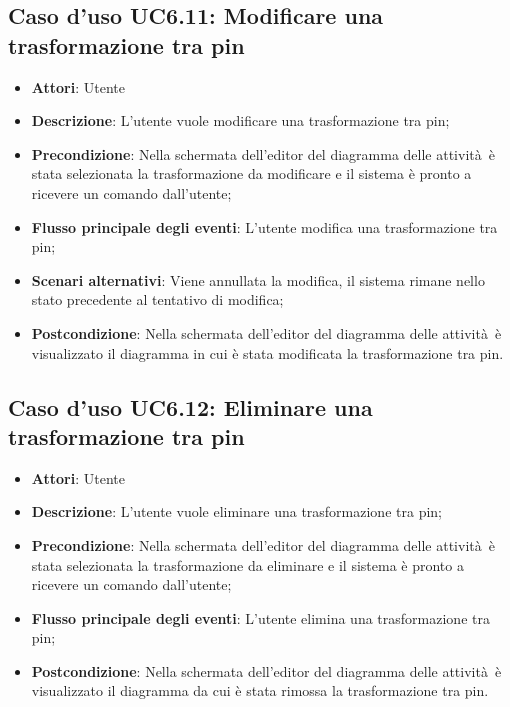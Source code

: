 \documentclass[../AnalisiDeiRequisiti.tex]{subfiles}
\begin{document}
				\subsection{Caso d'uso UC6.11: Modificare una trasformazione tra pin}
				\begin{itemize}
					\item \textbf{Attori}: Utente
					\item \textbf{Descrizione}: L'utente vuole modificare una trasformazione tra pin;
					\item \textbf{Precondizione}: Nella schermata dell'editor del diagramma delle attività è stata selezionata la trasformazione da modificare e il sistema è pronto a ricevere un comando dall'utente;
					\item \textbf{Flusso principale degli eventi}: L'utente modifica una trasformazione tra pin;
					\item \textbf{Scenari alternativi}: Viene annullata la modifica, il sistema rimane nello stato precedente al tentativo di modifica;
					\item \textbf{Postcondizione}: Nella schermata dell'editor del diagramma delle attività è visualizzato il diagramma in cui è stata modificata la trasformazione tra pin.
				\end{itemize}
				\subsection{Caso d'uso UC6.12: Eliminare una trasformazione tra pin}
				\begin{itemize}
					\item \textbf{Attori}: Utente
					\item \textbf{Descrizione}: L'utente vuole eliminare una trasformazione tra pin;
					\item \textbf{Precondizione}: Nella schermata dell'editor del diagramma delle attività è stata selezionata la trasformazione da eliminare e il sistema è pronto a ricevere un comando dall'utente;
					\item \textbf{Flusso principale degli eventi}: L'utente elimina una trasformazione tra pin;
					\item \textbf{Postcondizione}: Nella schermata dell'editor del diagramma delle attività è visualizzato il diagramma da cui è stata rimossa la trasformazione tra pin.
				\end{itemize}
\end{document}

